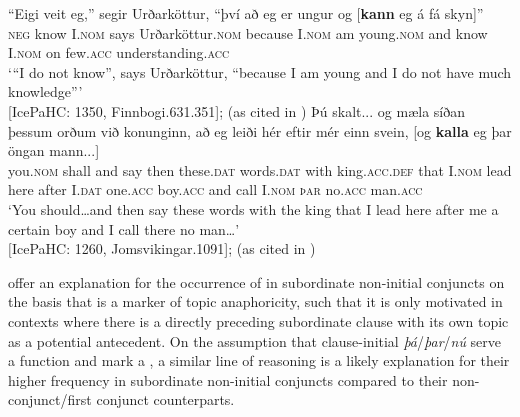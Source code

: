 \documentclass[output=paper,colorlinks,citecolor=brown]{langscibook}
\begin{document}
\ea \label{ni-conj}
\ea
\gll ``Eigi veit eg,'' segir Urðarköttur, ``{því að} eg er ungur og [\textbf{kann} eg á fá skyn]'' \\
\textsc{neg} know I.\textsc{nom} says Urðarköttur.\textsc{nom} because I.\textsc{nom} am young.\textsc{nom} and know I.\textsc{nom} on few.\textsc{acc} understanding.\textsc{acc}\\
\glt ‘``I do not know'', says Urðarköttur, ``because I am young and I do not have much knowledge''' \\ \hfill [IcePaHC: 1350, Finnbogi.631.351]; (as cited in \citealp[23]{booth-beck20200jhs})
\ex 
\gll Þú skalt... og mæla síðan  þessum orðum við konunginn, að eg leiði hér eftir mér einn svein, [og \textbf{kalla} eg þar öngan mann...] \\
you.\textsc{nom} shall  and say then these.\textsc{dat} words.\textsc{dat} with king.\textsc{acc.def} that I.\textsc{nom} lead here after I.\textsc{dat} one.\textsc{acc} boy.\textsc{acc} and call I.\textsc{nom} \textsc{þar} no.\textsc{acc} man.\textsc{acc}\\
\glt `You should\dots and then say these words with the king that I lead here after me a certain boy and I call there no man\dots' \\ 
$[$IcePaHC: 1260, Jomsvikingar.1091]; (as cited in \citealp[23]{booth-beck20200jhs})
\z 
\z 

\noindent \citet[25]{booth-beck20200jhs} offer an explanation for the occurrence of  in subordinate non-initial conjuncts on the basis that  is a marker of topic anaphoricity, such that it is only motivated in contexts where there is a directly preceding subordinate clause with its own topic as a potential antecedent. On the assumption that clause-initial \textit{þá}/\textit{þar}/\textit{nú} serve a  function and mark a , a similar line of reasoning is a likely explanation for their higher frequency in subordinate non-initial conjuncts compared to their non-conjunct/first conjunct counterparts.
\end{document}
